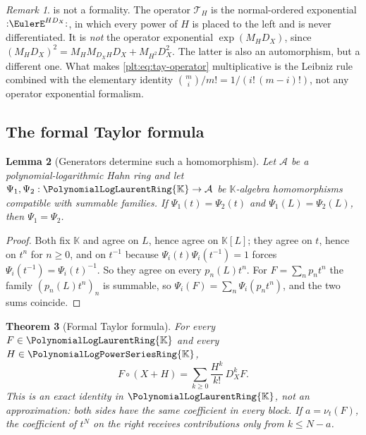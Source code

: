 \documentclass[11pt,oneside]{article}
\theoremstyle{plain}
\newtheorem{theorem}{Theorem}[section]
\newtheorem{lemma}[theorem]{Lemma}
\theoremstyle{definition}
\theoremstyle{remark}
\newtheorem{remark}[theorem]{Remark}
\newcommand{\K}{\mathbb{K}}
\newcommand{\PLpow}{\PolynomialLogPowerSeriesRing{\K}}   %
\newcommand{\PLlau}{\PolynomialLogLaurentRing{\K}}       %
\newcommand{\ordt}{\nu_{t}}                              %
\newcommand{\DX}{D_{X}}                                  %
\newcommand{\compose}{\mathbin{\circ}}
\begin{document}
\begin{remark}
 is not a formality.  The operator
\(\mathcal T_{H}\) is the normal-ordered exponential
\(\mathopen{:}\EulerE^{H\DX}\mathclose{:}\), in which every power of \(H\) is
placed to the left and is never differentiated.  It is \emph{not} the operator
exponential \(\exp(M_{H}\DX)\), since
\((M_{H}\DX)^{2}=M_{H}M_{\DX H}\DX+M_{H^{2}}\DX^{2}\).  The latter is also an
automorphism, but a different one.  What makes
\eqref{plt:eq:tay-operator} multiplicative is the Leibniz rule combined with
the elementary identity \(\binom{m}{i}/m!=1/(i!\,(m-i)!)\), not any operator
exponential formalism.
\end{remark}

\subsection{The formal Taylor formula}
\label{plt:sec:tay-formula}

\begin{lemma}[Generators determine such a homomorphism]
\label{plt:lem:tay-determined}
Let \(\mathcal A\) be a polynomial-logarithmic Hahn ring and let
\(\Psi_{1},\Psi_{2}:\PLlau\to\mathcal A\) be \(\K\)-algebra homomorphisms
compatible with summable families.  If \(\Psi_{1}(t)=\Psi_{2}(t)\) and
\(\Psi_{1}(L)=\Psi_{2}(L)\), then \(\Psi_{1}=\Psi_{2}\).
\end{lemma}

\begin{proof}
Both fix \(\K\) and agree on \(L\), hence agree on \(\K[L]\); they agree on
\(t\), hence on \(t^{n}\) for \(n\ge0\), and on \(t^{-1}\) because
\(\Psi_{i}(t)\Psi_{i}(t^{-1})=1\) forces
\(\Psi_{i}(t^{-1})=\Psi_{i}(t)^{-1}\).  So they agree on every
\(p_n(L)t^{n}\).  For \(F=\sum_np_nt^n\) the family
\((p_n(L)t^n)_n\) is summable, so
\(\Psi_{i}(F)=\sum_n\Psi_{i}(p_nt^n)\), and the two sums coincide.
\end{proof}

\begin{theorem}[Formal Taylor formula]\label{plt:thm:tay-formula}
For every \(F\in\PLlau\) and every \(H\in\PLpow\),
\begin{equation}\label{plt:eq:cmp-taylor}
 F\compose(X+H)
 =\sum_{k\ge0}\frac{H^{k}}{k!}\,\DX^{k}F .
\end{equation}
This is an exact identity in \(\PLlau\), not an approximation: both sides have
the same coefficient in every block.  If \(a=\ordt(F)\), the coefficient of
\(t^{N}\) on the right receives contributions only from \(k\le N-a\).
\end{theorem}
\end{document}

